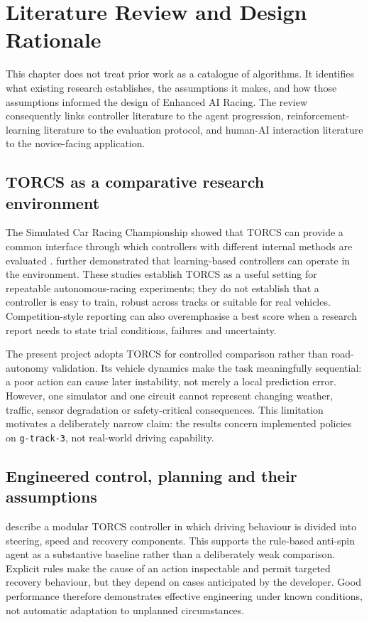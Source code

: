 \section{Literature Review and Design Rationale}
\label{ch:literature-review}

This chapter does not treat prior work as a catalogue of algorithms. It identifies what existing research establishes, the assumptions it makes, and how those assumptions informed the design of Enhanced AI Racing. The review consequently links controller literature to the agent progression, reinforcement-learning literature to the evaluation protocol, and human-AI interaction literature to the novice-facing application.

\subsection{TORCS as a comparative research environment}

The Simulated Car Racing Championship showed that TORCS can provide a common interface through which controllers with different internal methods are evaluated \parencite{loiacono2010}. \textcite{cardamone2010} further demonstrated that learning-based controllers can operate in the environment. These studies establish TORCS as a useful setting for repeatable autonomous-racing experiments; they do not establish that a controller is easy to train, robust across tracks or suitable for real vehicles. Competition-style reporting can also overemphasise a best score when a research report needs to state trial conditions, failures and uncertainty.

The present project adopts TORCS for controlled comparison rather than road-autonomy validation. Its vehicle dynamics make the task meaningfully sequential: a poor action can cause later instability, not merely a local prediction error. However, one simulator and one circuit cannot represent changing weather, traffic, sensor degradation or safety-critical consequences. This limitation motivates a deliberately narrow claim: the results concern implemented policies on \texttt{g-track-3}, not real-world driving capability.

\subsection{Engineered control, planning and their assumptions}

\textcite{onieva2009} describe a modular TORCS controller in which driving behaviour is divided into steering, speed and recovery components. This supports the rule-based anti-spin agent as a substantive baseline rather than a deliberately weak comparison. Explicit rules make the cause of an action inspectable and permit targeted recovery behaviour, but they depend on cases anticipated by the developer. Good performance therefore demonstrates effective engineering under known conditions, not automatic adaptation to unplanned circumstances.

